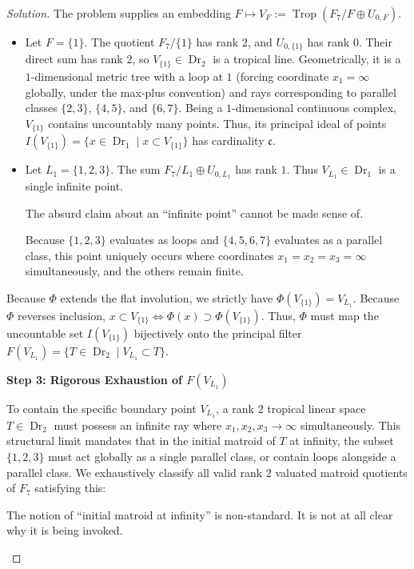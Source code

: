 \documentclass[12pt]{article}
\DeclareMathOperator{\Trop}{Trop}
\DeclareMathOperator{\Dr}{Dr}
\newcommand{\review}[1]{\begin{reviewbox}#1\end{reviewbox}}
\begin{document}
\begin{proof}[Solution]
The problem supplies an embedding $F \mapsto V_F := \Trop(F_7/F \oplus U_{0,F})$.
\begin{itemize}
    \item Let $F = \{1\}$. The quotient $F_7/\{1\}$ has rank $2$, and $U_{0,\{1\}}$ has rank $0$. Their direct sum has rank $2$, so $V_{\{1\}} \in \Dr_2$ is a tropical line. Geometrically, it is a $1$-dimensional metric tree with a loop at $1$ (forcing coordinate $x_1 = \infty$ globally, under the max-plus convention) and rays corresponding to parallel classes $\{2,3\}$, $\{4,5\}$, and $\{6,7\}$. Being a $1$-dimensional continuous complex, $V_{\{1\}}$ contains uncountably many points. Thus, its principal ideal of points $I(V_{\{1\}}) = \{ x \in \Dr_1 \mid x \subset V_{\{1\}} \}$ has cardinality $\mathfrak{c}$.
    \item Let $L_1 = \{1,2,3\}$. The sum $F_7/L_1 \oplus U_{0,L_1}$ has rank $1$. Thus $V_{L_1} \in \Dr_1$ is a single infinite point. \review{The absurd claim about an ``infinite point'' cannot be made sense of.} Because $\{1,2,3\}$ evaluates as loops and $\{4,5,6,7\}$ evaluates as a parallel class, this point uniquely occurs where coordinates $x_1 = x_2 = x_3 = \infty$ simultaneously, and the others remain finite.
\end{itemize}

Because $\Phi$ extends the flat involution, we strictly have $\Phi(V_{\{1\}}) = V_{L_1}$. Because $\Phi$ reverses inclusion, $x \subset V_{\{1\}} \iff \Phi(x) \supset \Phi(V_{\{1\}})$. Thus, $\Phi$ must map the uncountable set $I(V_{\{1\}})$ bijectively onto the principal filter $F(V_{L_1}) = \{ T \in \Dr_2 \mid V_{L_1} \subset T \}$.

\medskip
\noindent \textbf{Step 3: Rigorous Exhaustion of $F(V_{L_1})$}

To contain the specific boundary point $V_{L_1}$, a rank $2$ tropical linear space $T \in \Dr_2$ must possess an infinite ray where $x_1, x_2, x_3 \to \infty$ simultaneously. This structural limit mandates that in the initial matroid of $T$ at infinity, the subset $\{1,2,3\}$ must act globally as a single parallel class, or contain loops alongside a parallel class. We exhaustively classify all valid rank $2$ valuated matroid quotients of $F_7$ satisfying this:
\review{The notion of ``initial matroid at infinity'' is non-standard. It is not at all clear why it is being invoked.}


\end{proof}
\end{document}
